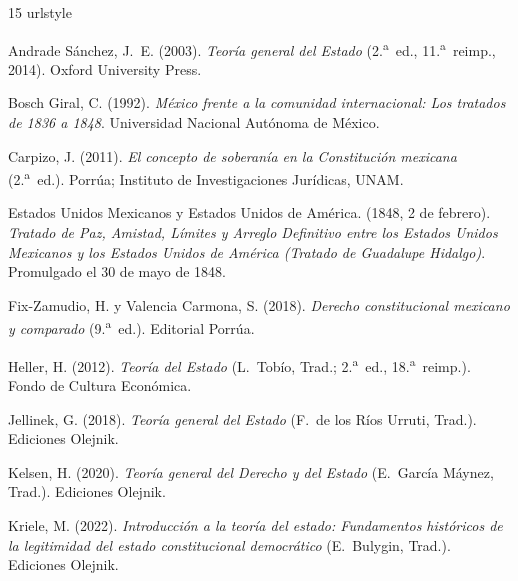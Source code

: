 \documentclass[12pt,spanish,letterpaper,oneside]{article}
\begin{document}
\begin{thebibliography}{15}
\providecommand{\natexlab}[1]{#1}
\providecommand{\url}[1]{\texttt{#1}}
\expandafter\ifx\csname urlstyle\endcsname\relax
  \providecommand{\doi}[1]{doi: #1}\else
  \providecommand{\doi}{doi: \begingroup \urlstyle{rm}\Url}\fi

Andrade S\'anchez, J.~E. (2003). \emph{Teor\'ia general del Estado} (2.\textsuperscript{a}~ed., 11.\textsuperscript{a}~reimp., 2014). Oxford University Press.

Bosch Giral, C. (1992). \emph{M\'exico frente a la comunidad internacional: Los tratados de 1836 a 1848}. Universidad Nacional Aut\'onoma de M\'exico.

Carpizo, J. (2011). \emph{El concepto de soberan\'ia en la Constituci\'on mexicana} (2.\textsuperscript{a}~ed.). Porr\'ua; Instituto de Investigaciones Jur\'idicas, UNAM.

Estados Unidos Mexicanos y Estados Unidos de Am\'erica. (1848, 2 de febrero). \emph{Tratado de Paz, Amistad, L\'imites y Arreglo Definitivo entre los Estados Unidos Mexicanos y los Estados Unidos de Am\'erica (Tratado de Guadalupe Hidalgo)}. Promulgado el 30 de mayo de 1848.

Fix-Zamudio, H. y Valencia Carmona, S. (2018). \emph{Derecho constitucional mexicano y comparado} (9.\textsuperscript{a}~ed.). Editorial Porr\'ua.

Heller, H. (2012). \emph{Teor\'ia del Estado} (L.~Tob\'io, Trad.; 2.\textsuperscript{a}~ed., 18.\textsuperscript{a}~reimp.). Fondo de Cultura Econ\'omica.

Jellinek, G. (2018). \emph{Teor\'ia general del Estado} (F.~de los R\'ios Urruti, Trad.). Ediciones Olejnik.

Kelsen, H. (2020). \emph{Teor\'ia general del Derecho y del Estado} (E.~Garc\'ia M\'aynez, Trad.). Ediciones Olejnik.

Kriele, M. (2022). \emph{Introducci\'on a la teor\'ia del estado: Fundamentos hist\'oricos de la legitimidad del estado constitucional democr\'atico} (E.~Bulygin, Trad.). Ediciones Olejnik.


\end{thebibliography}
\end{document}
